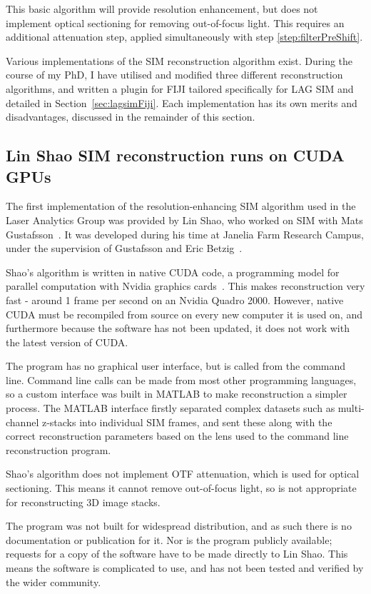 This basic algorithm will provide resolution enhancement, but does not implement optical sectioning for removing out-of-focus light.
This requires an additional attenuation step, applied simultaneously with step \ref{step:filterPreShift}. 

Various implementations of the SIM reconstruction algorithm exist.
During the course of my PhD, I have utilised and modified three different reconstruction algorithms, and written a plugin for FIJI tailored specifically for LAG SIM and detailed in Section~\ref{sec:lagsimFiji}.
Each implementation has its own merits and disadvantages, discussed in the remainder of this section.

\subsection{Lin Shao SIM reconstruction runs on CUDA GPUs}
The first implementation of the resolution-enhancing SIM algorithm used in the Laser Analytics Group was provided by Lin Shao, who worked on SIM with Mats Gustafsson~\cite{shao2011super}.
It was developed during his time at Janelia Farm Research Campus, under the supervision of Gustafsson and Eric Betzig~\cite{beach2014nonmuscle}.

Shao's algorithm is written in native CUDA code, a programming model for parallel computation with Nvidia graphics cards~\cite{sanders2010cuda}.
This makes reconstruction very fast - around 1 frame per second on an Nvidia Quadro 2000. 
However, native CUDA must be recompiled from source on every new computer it is used on, and furthermore because the software has not been updated, it does not work with the latest version of CUDA. 

The program has no graphical user interface, but is called from the command line. 
Command line calls can be made from most other programming languages, so a custom interface was built in MATLAB to make reconstruction a simpler process.  
The MATLAB interface firstly separated complex datasets such as multi-channel z-stacks into individual SIM frames, and sent these along with the correct reconstruction parameters based on the lens used to the command line reconstruction program. 

Shao's algorithm does not implement OTF attenuation, which is used for optical sectioning.
This means it cannot remove out-of-focus light, so is not appropriate for reconstructing 3D image stacks. 

The program was not built for widespread distribution, and as such there is no documentation or publication for it. 
Nor is the program publicly available; requests for a copy of the software have to be made directly to Lin Shao. 
This means the software is complicated to use, and has not been tested and verified by the wider community. 

